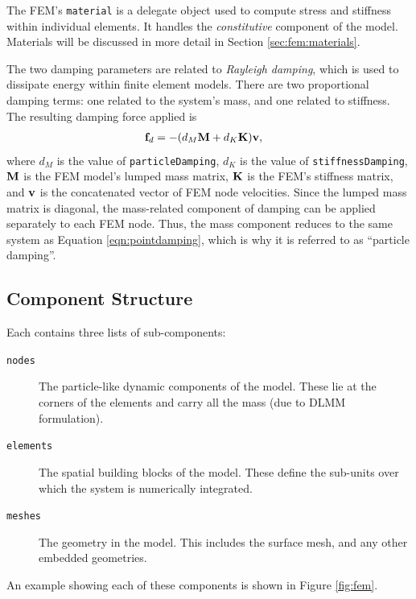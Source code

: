 The FEM's {\tt material} is a delegate object used to compute stress and 
stiffness within individual elements.  It handles the \emph{constitutive}
component of the model.  Materials will be discussed in more detail in
Section \ref{sec:fem:materials}.

The two damping parameters are related to \emph{Rayleigh damping}, which
is used to dissipate energy within finite element models.  There are two 
proportional damping terms: one related to the system's mass, and one related 
to stiffness.  The resulting damping force applied is
\begin{align}
	{\bf f}_d & = - (d_M {\bf M} + d_K{\bf K}){\bf v},
\end{align}
where $d_M$ is the value of {\tt particleDamping}, $d_K$ is the value of 
{\tt stiffnessDamping}, ${\bf M}$ is the FEM model's lumped mass matrix, ${\bf K}$ is 
the FEM's stiffness matrix, and ${\bf v}$ is the concatenated vector of FEM node
velocities.  Since the lumped mass matrix is diagonal, the mass-related
component of damping can be applied separately to each FEM node.  Thus, the
mass component reduces to the same system as Equation \eqref{eqn:pointdamping},
which is why it is referred to as ``particle damping''.

\subsection{Component Structure}

Each  contains three 
lists of sub-components:

\begin{description}
\item[{\tt nodes}]\mbox{}

The particle-like dynamic components of the model.  These lie at the corners
of the elements and carry all the mass (due to DLMM formulation).

\item[{\tt elements}]\mbox{}

The spatial building blocks of the model.  These define the sub-units over 
which the system is numerically integrated.

\item[{\tt meshes}]\mbox{}

The geometry in the model.  This includes the surface mesh, and any other
embedded geometries.
\end{description}

An example showing each of these components is shown in Figure \ref{fig:fem}.

